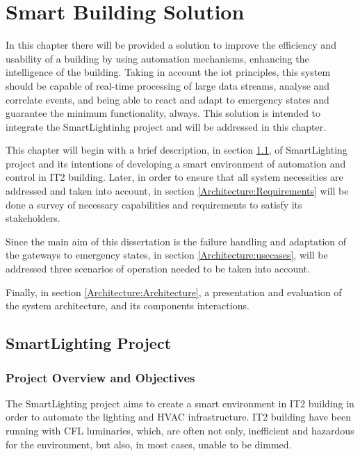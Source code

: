 \chapter{Smart Building Solution}
\label{chapter:architecture}

In this chapter there will be provided a solution to improve the efficiency and usability of a building by using automation mechanisms, enhancing the intelligence of the building. Taking in account the \ac{iot} principles, this system should be capable of real-time processing of large data streams, analyse and correlate events, and being able to react and adapt to emergency states and guarantee the minimum functionality, always. This solution is intended to integrate the SmartLightinhg project and will be addressed in this chapter.

This chapter will begin with a brief description, in section \ref{Architecture:slproject}, of SmartLighting project and its intentions of developing a smart environment of automation and control in IT2 building. Later, in order to ensure that all system necessities are addressed and taken into account, in section \ref{Architecture:Requirements} will be done a survey of necessary capabilities and  requirements to satisfy its stakeholders.

Since the main aim of this dissertation is the failure handling and adaptation of the gateways to emergency states, in section \ref{Architecture:usecases}, will be addressed three scenarios of operation needed to be taken into account.

Finally, in section \ref{Architecture:Architecture}, a presentation and evaluation of the system architecture, and its components interactions. 


\newpage


\section{SmartLighting Project}
\label{Architecture:slproject}

\subsection{Project Overview and Objectives}
\label{Architecture:Overview}

The SmartLighting project\cite{Moreira} aims to create a smart environment in IT2 building in order to automate the lighting and HVAC infrastructure. IT2 building have been running with CFL luminaries, which, are often not only, inefficient and hazardous for the environment, but also, in most cases, unable to be dimmed. 

